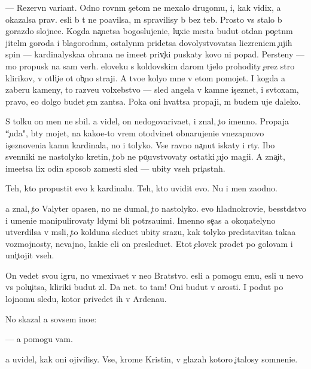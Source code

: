 \documentclass[10pt]{book}
\begin{document}
— Rezervn{\yi}{\y} variant. Odno rovn{\yi}m s{\c}etom ne mexalo drugomu, i, kak vidix, {\y}a okazalsa prav. {\Y}esli b{\yi} t{\yi} ne po{\y}avilsa, m{\yi} spravilisy b{\yi} bez teb{\ia}. Prosto vs{\e} stalo b{\yi} gorazdo slojne{\y}e. Kogda na{\c}netsa bogoslujeni{\y}e, lu{\c}xi{\y}e mesta budut otdan{\yi} po{\c}etn{\yi}m jitel{\ia}m goroda i blagorodn{\yi}m, ostalyn{\yi}m pridetsa dovolystvovatsa li{\q}ezreni{\y}em {\c}ujih spin — kardinalyska{\y}a ohrana ne ime{\y}et priv{\yi}{\c}ki puskaty kovo ni popad{\ia}. Persteny — mo{\y} propusk na sam{\yi}{\y} verh. {\C}eloveku s koldovskim darom t{\ia}jelo prohodity {\c}erez stro{\y} klirikov, v otli{\c}i{\y}e ot ob{\yi}{\c}no{\y} straji. A tvo{\y}e koly{\q}o mne v etom pomojet. I kogda {\y}a zaberu kameny, to razve{\y}u volxebstvo — sled angela v kamne is{\c}eznet, i sv{\ia}toxam, pravo, {\y}e{\x}o dolgo budet {\c}em zan{\ia}tsa. Poka oni hvat{\ia}tsa propaji, m{\yi} budem uje daleko.

S tolku on men{\ia} ne sbil. {\Y}a videl, on nedogovariva{\y}et, i znal, {\c}to imenno. Propaja ``{\c}uda", b{\yi}ty mojet, na kako{\y}e-to vrem{\ia} otodvinet obnarujeni{\y}e vnezapnovo is{\c}eznoveni{\y}a kamn{\ia} kardinala, no i tolyko. Vse ravno na{\c}nut iskaty i r{\yi}ty. Ibo sv{\ia}{\x}enniki ne nastolyko kretin{\yi}, {\c}tob{\yi} ne po{\c}uvstvovaty ostatki {\c}ujo{\y} magi{\y}i. A zna{\c}it, ime{\y}etsa lix odin sposob zamesti sled{\yi} — ubity vseh pri{\c}astn{\yi}h.

Teh, kto propustit {\y}evo k kardinalu. Teh, kto uvidit {\y}evo. Nu i men{\ia} zaodno.

{\Y}a znal, {\c}to Valyter opasen, no ne dumal, {\c}to nastolyko. {\Y}evo hladnokrovi{\y}e, besst{\yi}dstvo i umeni{\y}e manipulirovaty l{\iu}dymi b{\yi}li potr{\ia}sa{\y}u{\x}imi. Imenno se{\y}{\c}as {\y}a okon{\c}atelyno utverdilsa v m{\yi}sli, {\c}to kolduna sledu{\y}et ubity srazu, kak tolyko predstavitsa taka{\y}a vozmojnosty, nevajno, kaki{\y}e {\q}eli on presledu{\y}et. Etot {\c}elovek pro{\y}det po golovam i uni{\c}tojit vseh.

On vedet svo{\y}u igru, no vmexiva{\y}et v ne{\y}o Bratstvo. {\Y}esli {\y}a pomogu {\y}emu, {\y}esli u nevo vs{\e} polu{\c}itsa, kliriki budut zl{\yi}. Da net. {\C}to tam! Oni budut v {\y}arosti. I po{\y}dut po lojnomu sledu, kotor{\yi}{\y} privedet ih v Ardenau.

No skazal {\y}a sovsem ino{\y}e:

— {\Y}a pomogu vam.

{\Y}a uvidel, kak oni ojivilisy. Vse, krome Kristin{\yi}, v glazah kotoro{\y} {\c}italosy somneni{\y}e.
\end{document}
